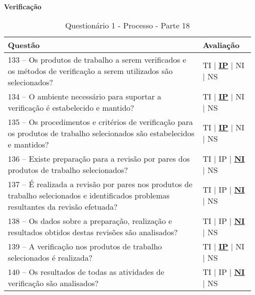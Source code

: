 \documentclass[openany,10pt,a4paper]{article}
\begin{document}
\begin{appendix}
	\begin{table}[h]
	\textbf{Verificação }
		\centering
		\caption{Questionário 1 - Processo - Parte 18}
		\begin{tabular}{p{5in}p{1in}}		
			\toprule
			\textbf{Questão}  & \textbf{Avaliação}\\ 
			\midrule
			133 – Os produtos de trabalho a serem verificados e os métodos de verificação a serem 
	utilizados são selecionados?
	 & TI | \underline{\textbf{IP}} | NI | NS \\
			\midrule
			134 – O ambiente necessário para suportar a verificação é estabelecido e mantido?
	 & TI | \underline{\textbf{IP}} | NI | NS \\
			\midrule
			135 – Os procedimentos e critérios de verificação para os produtos de trabalho selecionados são 
	estabelecidos e mantidos?
	 & TI | \underline{\textbf{IP}} | NI | NS \\
			\midrule
			136 – Existe preparação para a revisão por pares dos produtos de trabalho selecionados?
	 & TI | IP | \underline{\textbf{NI}} | NS \\
			\midrule
			137 – É realizada a revisão por pares nos produtos de trabalho selecionados e identificados 
	problemas resultantes da revisão efetuada?
	  & TI | IP | \underline{\textbf{NI}} | NS \\
			\midrule
			138 – Os dados sobre a preparação, realização e resultados obtidos destas revisões são 
	analisados?
	 & TI | IP | \underline{\textbf{NI}} | NS \\
	 \midrule
			139 – A verificação nos produtos de trabalho selecionados é realizada?
	 & TI | \underline{\textbf{IP}} | NI | NS \\
	  \midrule
			140 – Os resultados de todas as atividades de verificação são analisados? 
	 & TI | IP | \underline{\textbf{NI}} | NS \\
			\bottomrule
		\end{tabular} 
	\end{table}
	

\end{appendix}
\end{document}
